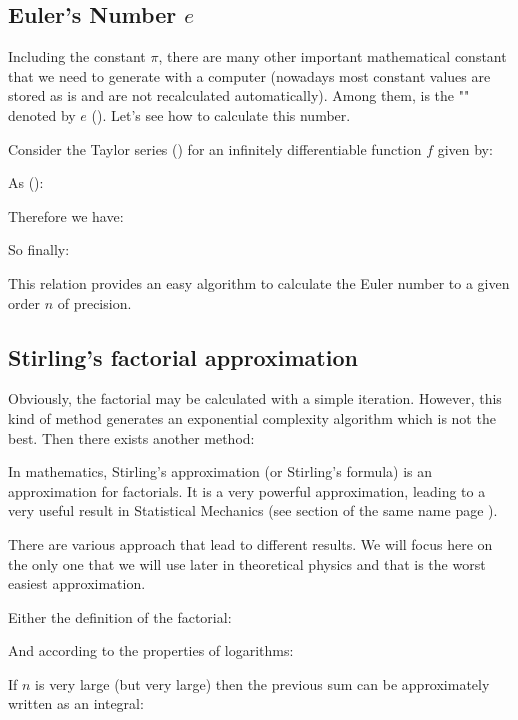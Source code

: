 	\subsection{Euler's Number $e$}\label{euler number computation}
	Including the constant $\pi$, there are many other important mathematical constant that we need to generate with a computer (nowadays most constant values are stored as is and are not recalculated automatically). Among them, is the "" denoted by $e$ (). Let's see how to calculate this number.
	
	Consider the Taylor series () for an infinitely differentiable function $f$ given by:
	
	As ():
	
	Therefore we have:
	
	So finally:
	
	This relation provides an easy algorithm to calculate the Euler number to a given order $n$ of precision.

	\subsection{Stirling's factorial approximation}\label{stirling}
	Obviously, the factorial may be calculated with a simple iteration. However, this kind of method generates an exponential complexity algorithm which is not the best. Then there exists another method:

	In mathematics, Stirling's approximation (or Stirling's formula) is an approximation for factorials. It is a very powerful approximation, leading to a very useful result in Statistical Mechanics (see section of the same name page \pageref{statistical physics distributions}). 

	There are various approach that lead to different results. We will focus here on the only one that we will use later in theoretical physics and that is the worst easiest approximation.
	
	Either the definition of the factorial:
	
	
	And according to the properties of logarithms:
	
	
	If $n$ is very large (but very large) then the previous sum can be approximately written as an integral:
	
